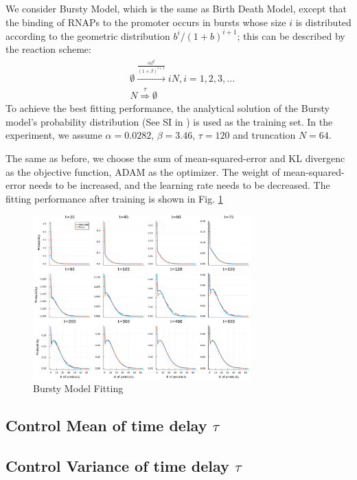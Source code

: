 \documentclass[a4paper,10pt]{article}
\begin{document}
We consider Bursty Model, which is the same as Birth Death Model, except that the binding of RNAPs to the promoter occurs in bursts whose size $i$ is distributed according to the geometric distribution $b^i/(1 + b)^{i+1}$; this can be described by the reaction scheme:
\begin{equation}\label{birth-death}
	\begin{aligned}
		&\emptyset\stackrel{\frac{\alpha\beta^i}{(1+\beta)^{i+1}}}\longrightarrow iN,i=1,2,3,...\\ &N\stackrel{\tau}\Rightarrow\emptyset
	\end{aligned}
\end{equation}
To achieve the best fitting performance, the analytical solution of the Bursty model's probability distribution (See SI in \cite{jiang2021neural}) is used as the training set. In the experiment, we assume $\alpha=0.0282$, $\beta=3.46$, $\tau=120$ and truncation $N=64$.

The same as before, we choose the sum of mean-squared-error and KL divergenc as the  objective  function, ADAM as the optimizer. The weight of mean-squared-error needs to be increased, and the learning rate needs to be decreased. The fitting performance after training is shown in Fig. \ref{Bursty Model Fitting}
\begin{figure}[h]
	\centering
	\includegraphics[width=0.75\textwidth]{Figs/Bursty_fitting.pdf}
	\caption{Bursty Model Fitting}\label{Bursty Model Fitting}  
\end{figure}

\subsection{Control Mean of time delay $\tau$}

\subsection{Control Variance of time delay $\tau$}
\end{document}
